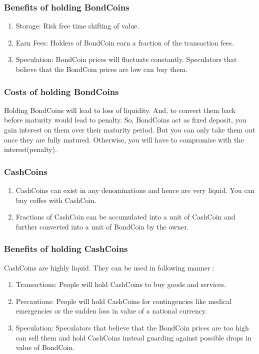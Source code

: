 \subsubsection{Benefits of holding BondCoins}

\begin{enumerate}
    \item Storage: Risk free time shifting of value.
    \item Earn Fees: Holders of BondCoin earn a fraction of the transaction fees.
    \item Speculation: BondCoin prices will fluctuate constantly. Speculators that believe that the BondCoin prices are low can buy them.
\end{enumerate}

\subsubsection{Costs of holding BondCoins}

Holding BondCoins will lead to loss of liquidity. And, to convert them back before maturity would lead to penalty. So, BondCoins act as fixed deposit, you gain interest on them over their maturity period. But you can only take them out once they are fully matured. Otherwise, you will have to compromise with the interest(penalty).

\subsubsection{CashCoins}

\begin{enumerate}
    \item CashCoins can exist in any denominations and hence are very liquid. You can buy coffee with CashCoin.
    \item Fractions of CashCoin can be accumulated into a unit of CashCoin and further converted into a unit of BondCoin by the owner.
\end{enumerate}

\subsubsection{Benefits of holding CashCoins}

CashCoins are highly liquid. They can be used in following manner :

\begin{enumerate}
    \item Transactions: People will hold CashCoins to buy goods and services.
    \item Precautions: People will hold CashCoins for contingencies like medical emergencies or the sudden loss in value of a national currency.
    \item Speculation: Speculators that believe that the BondCoin prices are too high can sell them and hold CashCoins instead guarding against possible drops in value of BondCoin.
\end{enumerate}

